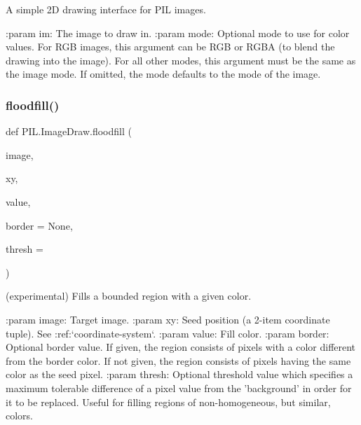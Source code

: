 \begin{DoxyVerb}A simple 2D drawing interface for PIL images.

:param im: The image to draw in.
:param mode: Optional mode to use for color values.  For RGB
   images, this argument can be RGB or RGBA (to blend the
   drawing into the image).  For all other modes, this argument
   must be the same as the image mode.  If omitted, the mode
   defaults to the mode of the image.
\end{DoxyVerb}
 \mbox{\label{namespacePIL_1_1ImageDraw_a04f749c473f734ca12218058346457a3}} 
\subsubsection{\texorpdfstring{floodfill()}{floodfill()}}
{\footnotesize\ttfamily def P\+I\+L.\+Image\+Draw.\+floodfill (\begin{DoxyParamCaption}\item[{}]{image,  }\item[{}]{xy,  }\item[{}]{value,  }\item[{}]{border = {\ttfamily None},  }\item[{}]{thresh = {} }\end{DoxyParamCaption})}

\begin{DoxyVerb}(experimental) Fills a bounded region with a given color.

:param image: Target image.
:param xy: Seed position (a 2-item coordinate tuple). See
    :ref:`coordinate-system`.
:param value: Fill color.
:param border: Optional border value.  If given, the region consists of
    pixels with a color different from the border color.  If not given,
    the region consists of pixels having the same color as the seed
    pixel.
:param thresh: Optional threshold value which specifies a maximum
    tolerable difference of a pixel value from the 'background' in
    order for it to be replaced. Useful for filling regions of
    non-homogeneous, but similar, colors.
\end{DoxyVerb}
 \mbox{\label{namespacePIL_1_1ImageDraw_a795718ecd4f1ff28d17008a4e9f97531}} 
